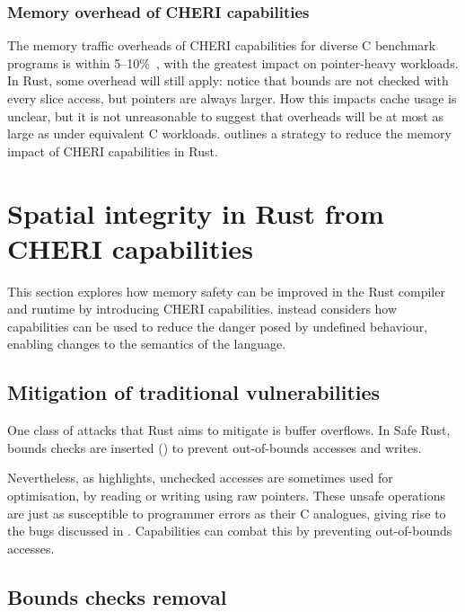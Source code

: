 \documentclass[dissertation.tex]{subfiles}
\begin{document}
\subsubsection{Memory overhead of CHERI capabilities}
The memory traffic overheads of CHERI capabilities for diverse C
benchmark programs is within 5--10\%~\cite{cheri-tagged-memory}, with
the greatest impact on pointer-heavy workloads.
In Rust, some overhead will still apply: notice that bounds are not
checked with every slice access, but pointers are always larger.
How this impacts cache usage is unclear, but it is not unreasonable to
suggest that overheads will be at most as large as under equivalent C
workloads.
 outlines a strategy to reduce the memory
impact of CHERI capabilities in Rust.


\section{Spatial integrity in Rust from CHERI capabilities}
\label{sec:eval-rust}

This section explores how memory safety can be improved in the Rust
compiler and runtime by introducing CHERI capabilities.
 instead considers how capabilities can be
used to reduce the danger posed by undefined behaviour, enabling changes
to the semantics of the language.

\subsection{Mitigation of traditional vulnerabilities}
\label{sec:eval-rust-vulns}

One class of attacks that Rust aims to mitigate is buffer overflows.
In Safe Rust, bounds checks are inserted ()
to prevent out-of-bounds accesses and writes.

Nevertheless, as  highlights, unchecked accesses
are sometimes used for optimisation, by reading or writing using raw
pointers.
These unsafe operations are just as susceptible to programmer errors as
their C analogues, giving rise to the bugs discussed in
.
Capabilities can combat this by preventing out-of-bounds accesses.


\subsection{Bounds checks removal}
\label{sec:eval-rust-bounds}
\end{document}
